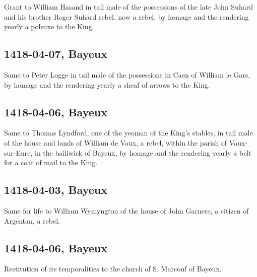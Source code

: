 \documentclass[a4paper,12pt,twoside]{book}
\begin{document}
                
                     Grant to William Hasand in tail male of the possessions of the late John Suhard and his brother Roger Suhard rebel, now a rebel, by homage and the rendering yearly a poleaxe to the King.
                  
                
                \subsection{1418-04-07, Bayeux}
                
                
                     Same to Peter Logge in tail male of the possessions in Caen of William le Gars, by homage and the rendering yearly a sheaf of arrows to the King.
                  
                
                \subsection{1418-04-06, Bayeux}
                
                
                     Same to Thomas Lyndford, one of the yeoman of the King's stables, in tail male of the house and lands of William de Vaux, a rebel, within the parish of Vaux-sur-Eure, in the bailiwick of Bayeux, by homage and the rendering yearly a belt for a coat of mail to the King.
                  
                
                \subsection{1418-04-03, Bayeux}
                
                
                     Same for life to William Wymyngton of the house of John Garnere, a citizen of Argentan, a rebel.
                  
                
                \subsection{1418-04-06, Bayeux}
                
                
                     Restitution of its temporalities to the church of S. Marcouf of Bayeux.
                  
\end{document}
